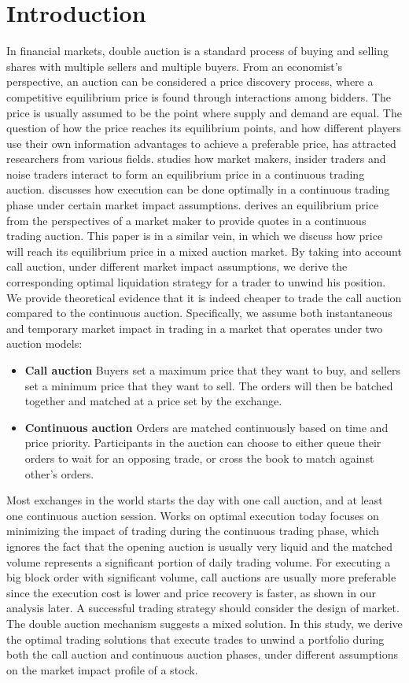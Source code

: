 \documentclass{article}
\begin{document}
\section{Introduction}
In financial markets, double auction is a standard process of buying and selling shares with multiple sellers and multiple buyers. From an economist's perspective, an auction can be considered a price discovery process, where a competitive equilibrium price is found through interactions among bidders. The price is usually assumed to be the point where supply and demand are equal. The question of how the price reaches its equilibrium points, and how different players use their own information advantages to achieve a preferable price, has attracted researchers from various fields. \cite{Kyle1985} studies how market makers, insider traders and noise traders interact to form an equilibrium price in a continuous trading auction. \cite{AlmgrenChriss2000} discusses how execution can be done optimally in a continuous trading phase under certain market impact assumptions. \cite{Avellaneda2008} derives an equilibrium price from the perspectives of a market maker to provide quotes in a continuous trading auction. This paper is in a similar vein, in which we discuss how price will reach its equilibrium price in a mixed auction market. By taking into account call auction, under different market impact assumptions, we derive the corresponding optimal liquidation strategy for a trader to unwind his position. We provide theoretical evidence that it is indeed cheaper to trade the call auction compared to the continuous auction. Specifically, we assume both instantaneous and temporary market impact in trading in a market that operates under two auction models:
\begin{itemize}
  \item \textbf{Call auction} Buyers set a maximum price that they want to buy, and sellers set a minimum price that they want to sell. The orders will then be batched together and matched at a price set by the exchange.
  \item \textbf{Continuous auction} Orders are matched continuously based on time and price priority. Participants in the auction can choose to either queue their orders to wait for an opposing trade, or cross the book to match against other's orders.
\end{itemize}
Most exchanges in the world starts the day with one call auction, and at least one continuous auction session. Works on optimal execution today focuses on minimizing the impact of trading during the continuous trading phase, which ignores the fact that the opening auction is usually very liquid and the matched volume represents a significant portion of daily trading volume. For executing a big block order with significant volume, call auctions are usually more preferable since the execution cost is lower and price recovery is faster, as shown in our analysis later. A successful trading strategy should consider the design of market. The double auction mechanism suggests a mixed solution. In this study, we derive the optimal trading solutions that execute trades to unwind a portfolio during both the call auction and continuous auction phases, under different assumptions on the market impact profile of a stock.
\end{document}
